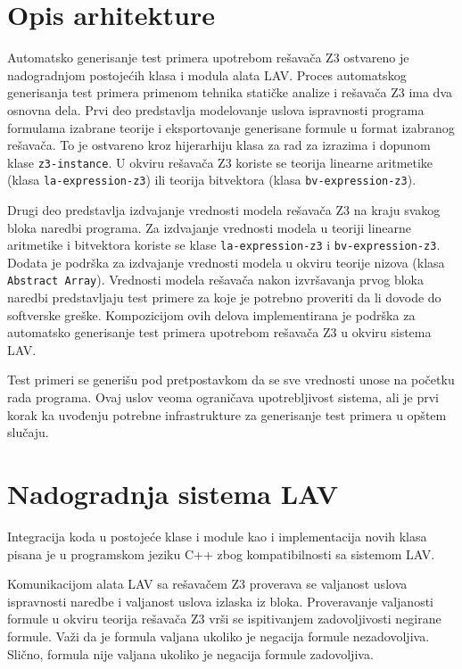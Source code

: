 \documentclass[12pt,oneside]{memoir}
\begin{document}
\section{Opis arhitekture} \label{sec:deo4}
Automatsko generisanje test primera upotrebom rešavača Z3 ostvareno je nadogradnjom postojećih klasa i modula alata LAV. Proces automatskog generisanja test primera primenom tehnika statičke analize i rešavača Z3 ima dva osnovna dela. Prvi deo predstavlja modelovanje uslova ispravnosti programa formulama izabrane teorije i eksportovanje generisane formule u format izabranog rešavača. To je ostvareno kroz hijerarhiju klasa za rad za izrazima i dopunom klase \texttt{z3-instance}. U okviru rešavača Z3 koriste se teorija linearne aritmetike (klasa \texttt{la-expression-z3}) ili teorija bitvektora (klasa \texttt{bv-expression-z3}).



Drugi deo predstavlja izdvajanje vrednosti modela rešavača Z3 na kraju svakog bloka naredbi programa. 
Za izdvajanje vrednosti modela u teoriji linearne aritmetike i bitvektora koriste se klase \texttt{la-expression-z3} i \texttt{bv-expression-z3}. Dodata je podrška za izdvajanje vrednosti modela u okviru teorije nizova (klasa \texttt{Abstract Array}). Vrednosti modela rešavača nakon izvršavanja prvog bloka naredbi predstavljaju test primere za koje je potrebno proveriti da li dovode do softverske greške. 
Kompozicijom ovih delova implementirana je podrška za automatsko generisanje test primera upotrebom rešavača Z3 u okviru sistema LAV. 
\par
Test primeri se generišu pod pretpostavkom da se sve vrednosti unose na početku rada programa. Ovaj uslov veoma ograničava upotrebljivost sistema, ali je prvi korak ka uvođenju potrebne infrastrukture za generisanje test primera u opštem slučaju. 
\par


\section{Nadogradnja sistema LAV} \label{sec:deo5}
Integracija koda u postojeće klase i module kao i implementacija novih klasa pisana je u programskom jeziku C++ zbog kompatibilnosti sa sistemom LAV.

Komunikacijom alata LAV sa rešavačem Z3 proverava se valjanost uslova ispravnosti naredbe i valjanost uslova izlaska iz bloka. Proveravanje valjanosti formule u okviru teorija rešavača Z3 vrši se ispitivanjem zadovoljivosti negirane formule. Važi da je formula valjana ukoliko je negacija formule nezadovoljiva. Slično, formula nije valjana ukoliko je negacija formule zadovoljiva.
\end{document}
